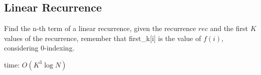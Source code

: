 \subsection{Linear Recurrence}

Find the n-th term of a linear recurrence, given the recurrence $rec$ and the first $K$ values of the recurrence, remember that first\_k[i] is the value of $f(i)$, considering 0-indexing. 

time: $O(K^{3} \log{N})$
